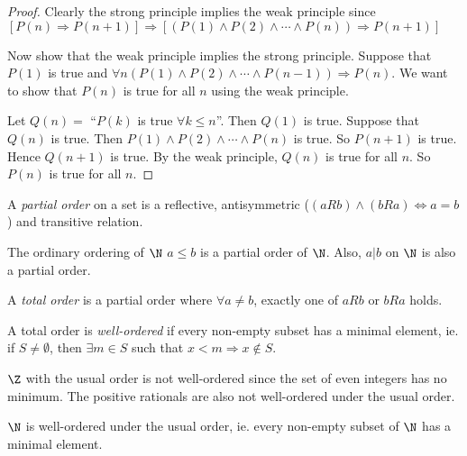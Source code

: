 \documentclass[a4paper]{article}
\begin{document}
  \begin{proof}
    Clearly the strong principle implies the weak principle since $[P(n)\Rightarrow P(n + 1)] \Rightarrow [(P(1)\wedge P(2)\wedge \cdots \wedge P(n))\Rightarrow P(n + 1)]$

    Now show that the weak principle implies the strong principle. Suppose that $P(1)$ is true and $\forall n(P(1)\wedge P(2)\wedge \cdots \wedge P(n - 1))\Rightarrow P(n)$. We want to show that $P(n)$ is true for all $n$ using the weak principle.

    Let $Q(n) = $ ``$P(k)$ is true $\forall k\leq n$''. Then $Q(1)$ is true. Suppose that $Q(n)$ is true. Then $P(1)\wedge P(2)\wedge\cdots \wedge P(n)$ is true. So $P(n+1)$ is true. Hence $Q(n + 1)$ is true. By the weak principle, $Q(n)$ is true for all $n$. So $P(n)$ is true for all $n$.
  \end{proof}

  \begin{defi}
    A \emph{partial order} on a set is a reflective, antisymmetric ($(aRb) \wedge (bRa) \Leftrightarrow a = b$) and transitive relation. 
  \end{defi}

  \begin{eg}
    The ordinary ordering of $\N$ $a\leq b$ is a partial order of $\N$. Also, $a|b$ on $\N$ is also a partial order.
  \end{eg}

  \begin{defi}
    A \emph{total order} is a partial order where $\forall a\not= b$, exactly one of $aRb$ or $bRa$ holds.
  \end{defi}

  \begin{defi}
    A total order is \emph{well-ordered} if every non-empty subset has a minimal element, ie. if $S\not= \emptyset$, then $\exists m\in S$ such that $x < m \Rightarrow x\not\in S$.
  \end{defi}

  \begin{eg}
    $\Z$ with the usual order is not well-ordered since the set of even integers has no minimum. The positive rationals are also not well-ordered under the usual order.
  \end{eg}

  \begin{thm}
    $\N$ is well-ordered under the usual order, ie. every non-empty subset of $\N$ has a minimal element.
  \end{thm}
\end{document}
